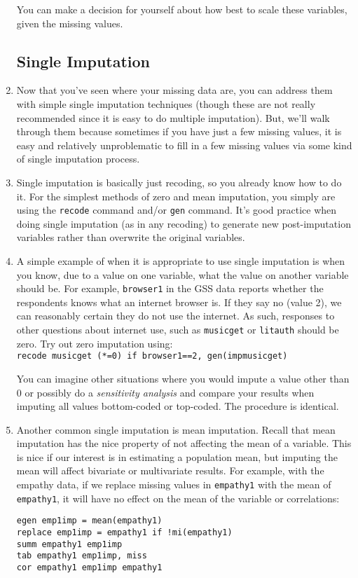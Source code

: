 \documentclass[a4paper,12pt]{article}
\begin{document}
\begin{enumerate}
You can make a decision for yourself about how best to scale these variables, given the missing values.


\subsection*{Single Imputation}

\item Now that you've seen where your missing data are, you can address them with simple single imputation techniques (though these are not really recommended since it is easy to do multiple imputation). But, we'll walk through them because sometimes if you have just a few missing values, it is easy and relatively unproblematic to fill in a few missing values via some kind of single imputation process.

\item Single imputation is basically just recoding, so you already know how to do it. For the simplest methods of zero and mean imputation, you simply are using the \texttt{recode} command and/or \texttt{gen} command. It's good practice when doing single imputation (as in any recoding) to generate new post-imputation variables rather than overwrite the original variables.

\item A simple example of when it is appropriate to use single imputation is when you know, due to a value on one variable, what the value on another variable should be. For example, \texttt{browser1} in the GSS data reports whether the respondents knows what an internet browser is. If they say no (value 2), we can reasonably certain they do not use the internet. As such, responses to other questions about internet use, such as \texttt{musicget} or \texttt{litauth} should be zero. Try out zero imputation using:\\
\texttt{recode musicget (*=0) if browser1==2, gen(impmusicget)}

You can imagine other situations where you would impute a value other than 0 or possibly do a {\em sensitivity analysis} and compare your results when imputing all values bottom-coded or top-coded. The procedure is identical.

\item Another common single imputation is mean imputation. Recall that mean imputation has the nice property of not affecting the mean of a variable. This is nice if our interest is in estimating a population mean, but imputing the mean will affect bivariate or multivariate results. For example, with the empathy data, if we replace missing values in \texttt{empathy1} with the mean of \texttt{empathy1}, it will have no effect on the mean of the variable or correlations:
\begin{verbatim}
egen emp1imp = mean(empathy1)
replace emp1imp = empathy1 if !mi(empathy1)
summ empathy1 emp1imp
tab empathy1 emp1imp, miss
cor empathy1 emp1imp empathy1
\end{verbatim}


\end{enumerate}
\end{document}
